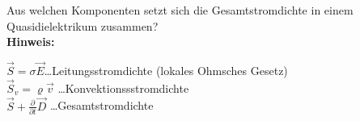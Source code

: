\begin{question}[section=3,name={Gesamtstromdichte},difficulty=,quantity=,type=thr,tags={}]
	Aus welchen Komponenten setzt sich die Gesamtstromdichte in einem Quasidielektrikum zusammen?
	\\ \textbf{Hinweis:}\\
	
\end{question}
\begin{solution}
	$\vec S = \sigma \vec E$\dots Leitungsstromdichte (lokales Ohmsches Gesetz)\\
	$\vec S_v = \varrho \vec v$ \dots Konvektionssstromdichte\\
	$\vec S + \frac{\partial}{\partial t} \vec D$ \dots Gesamtstromdichte
\end{solution}